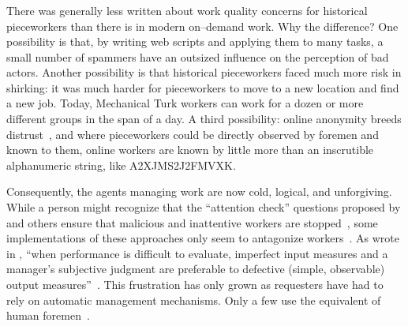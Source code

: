 \documentclass[trackingWork]{subfiles}
\begin{document}
\subsubsection{\whatchanged}

\begin{comment}
	*workers make little money but love autonomy --- workers make little money
	workers blamed for quality --- ???
	both cases, sociality is hard
	*collective action hard --- collective action succeeded
	- algorithms, not managers
\end{comment}

There was generally less written about work quality concerns for historical pieceworkers than there is in modern on--demand work. 
Why the difference? 
One possibility is that, by writing web scripts and applying them to many tasks,
a small number of spammers have an outsized influence on the perception of bad actors.
Another possibility is that historical pieceworkers faced much more risk in shirking:
it was much harder for pieceworkers to move to a new location and find a new job.
Today, Mechanical Turk workers can work for a dozen or more different groups in the span of a day.
A third possibility: online anonymity breeds distrust~\cite{friedman2000trust}, and
where pieceworkers could be directly observed by foremen and known to them,
online workers are known by little more than an inscrutible alphanumeric string, like A2XJMS2J2FMVXK.



Consequently,
the agents managing work are now
cold, logical, and unforgiving.
While a person might recognize that the ``attention check'' questions
proposed by \citeauthor{le2010ensuring} and others ensure that
malicious and inattentive workers are stopped~\cite{le2010ensuring,AAAIW113995},
some implementations of these approaches
only seem to antagonize workers~\cite{takingAHITMcInnis}.
As \citeauthor{10.2307/2555446} wrote in \citeyear{10.2307/2555446},
``when performance is difficult to evaluate,
imperfect input measures and
a manager's subjective judgment are preferable to
defective (simple, observable) output measures''~\cite{10.2307/2555446}.
This frustration has only grown as requesters have had to rely on automatic management mechanisms.
Only a few use the equivalent of human foremen~\cite{haas2015argonaut,kulkarni2012mobileworks}.
\end{document}
